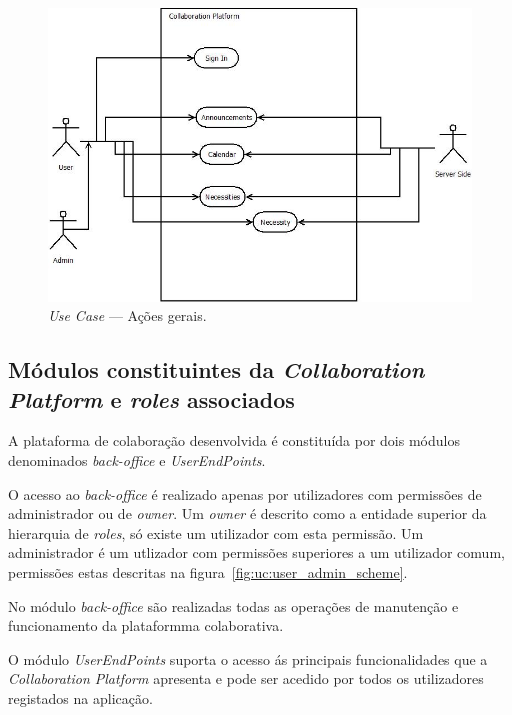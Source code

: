 \begin{figure}[H]
    \centering
    \includegraphics[scale=0.6]{figures/General Actions.jpeg}
    \caption{\textit{Use Case} --- Ações gerais.}\label{fig:uc:generalActions}
\end{figure}

\subsection{Módulos constituintes da \textit{Collaboration Platform} e \textit{roles} associados}

A plataforma de colaboração desenvolvida é constituída por dois módulos denominados \textit{back-office} e \textit{UserEndPoints}. 

\par
O acesso ao \textit{back-office} é realizado apenas por utilizadores com permissões de administrador ou de \textit{owner}. 
Um \textit{owner} é descrito como a entidade superior da hierarquia de \textit{roles}, só existe um utilizador com esta permissão. 
Um administrador é um utlizador com permissões superiores a um utilizador comum, permissões estas descritas na figura~\ref{fig:uc:user_admin_scheme}. 

\par
No módulo \textit{back-office} são realizadas todas as operações de manutenção e funcionamento da plataformma colaborativa.

\par
O módulo \textit{UserEndPoints} suporta o acesso ás principais funcionalidades que a \textit{Collaboration Platform} apresenta e pode ser acedido por todos os utilizadores registados na aplicação.

